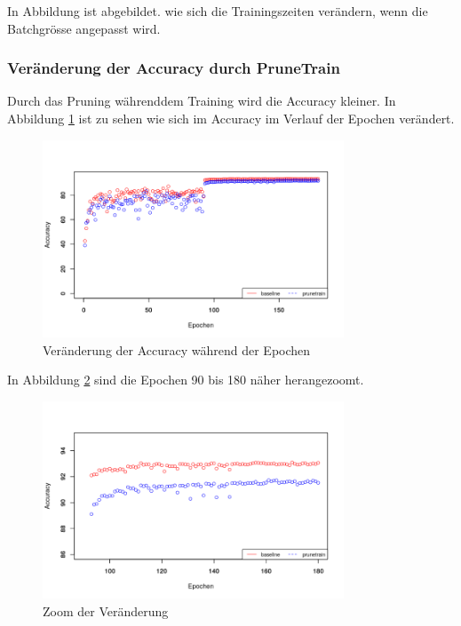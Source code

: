 
In Abbildung  ist abgebildet. wie sich die Trainingszeiten verändern, wenn die Batchgrösse angepasst wird.



\subsubsection{Veränderung der Accuracy durch PruneTrain}

Durch das Pruning währenddem Training wird die Accuracy kleiner. In Abbildung \ref{abb:PTaccuracy} ist zu sehen wie sich im Accuracy im Verlauf der Epochen verändert.  

\begin{figure}[h]
 \centering
 \includegraphics[width=0.8\textwidth]{KapitelPartB/Images/PTaccuracy.png}
 \caption{Veränderung der Accuracy während der Epochen}
 \label{abb:PTaccuracy}
\end{figure}

In Abbildung \ref{abb:PTaccuracyzoom} sind die Epochen 90 bis 180 näher herangezoomt.

\begin{figure}[h]
 \centering
 \includegraphics[width=0.8\textwidth]{KapitelPartB/Images/PTaccuracyzoom.png}
 \caption{Zoom der Veränderung}
 \label{abb:PTaccuracyzoom}
\end{figure}

